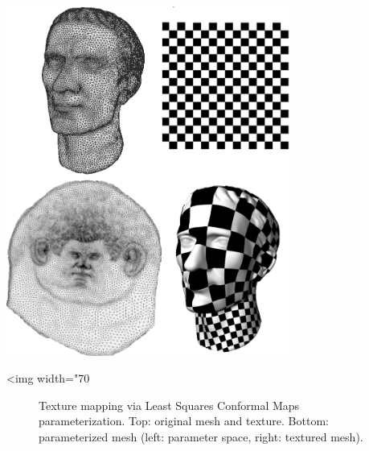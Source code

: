 \begin{center}
    \label{Surface_mesh_parameterization-fig-introduction}
    \begin{ccTexOnly}
        \includegraphics[width=0.7\textwidth]{Surface_mesh_parameterization/introduction} %
    \end{ccTexOnly}
    \begin{ccHtmlOnly}
        <img width="70%
    \end{ccHtmlOnly}
    \begin{figure}[h]
        \caption{Texture mapping via Least Squares Conformal Maps parameterization. Top: original mesh and texture. Bottom: parameterized mesh (left: parameter space, right: textured mesh).}
    \end{figure}
\end{center}


